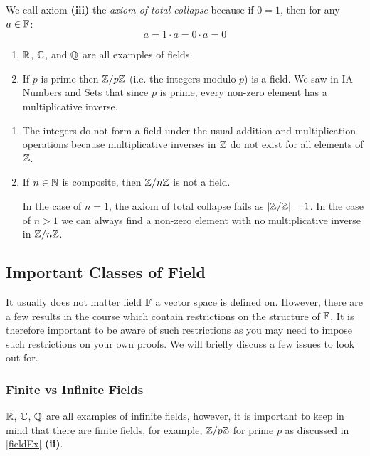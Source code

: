 \documentclass[../main.tex]{subfiles}
\begin{document}
\begin{remark}
  We call axiom \textbf{(iii)} the \textit{axiom of total collapse} because if $0 = 1$, then for any $a \in \mathbb{F}$:
  \[
    a = 1 \cdot a = 0 \cdot a = 0
  \]
\end{remark}
\begin{example} \label{fieldEx}
  \begin{enumerate}
    \item $\mathbb{R}$, $\mathbb{C}$, and $\mathbb{Q}$ are all examples of fields.
    \item If $p$ is prime then $\mathbb{Z} / p\mathbb{Z}$ (i.e. the integers modulo $p$) is a field.
      We saw in IA Numbers and Sets that since $p$ is prime, every non-zero element has a multiplicative inverse.
  \end{enumerate}
\end{example}
\begin{example}
  \begin{enumerate}
    \item The integers do not form a field under the usual addition and multiplication operations because multiplicative inverses in $\mathbb{Z}$ do not exist for all elements of $\mathbb{Z}$.
    \item If $n \in \mathbb{N}$ is composite, then $\mathbb{Z} / n\mathbb{Z}$ is not a field.

      In the case of $n = 1$, the axiom of total collapse fails as $|\mathbb{Z} / \mathbb{Z}| = 1$.
      In the case of $n > 1$ we can always find a non-zero element with no multiplicative inverse in $\mathbb{Z} / n\mathbb{Z}$.
  \end{enumerate}
\end{example}
\subsection{Important Classes of Field}
It usually does not matter field $\mathbb{F}$ a vector space is defined on.
However, there are a few results in the course which contain restrictions on the structure of $\mathbb{F}$.
It is therefore important to be aware of such restrictions as you may need to impose such restrictions on your own proofs.
We will briefly discuss a few issues to look out for.
\subsubsection{Finite vs Infinite Fields}
$\mathbb{R}$, $\mathbb{C}$, $\mathbb{Q}$ are all examples of infinite fields, however, it is important to keep in mind that there are finite fields, for example, $\mathbb{Z} / p\mathbb{Z}$ for prime $p$ as discussed in \cref{fieldEx} \textbf{(ii)}.
\end{document}
